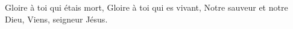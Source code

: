 Gloire à toi qui étais mort,
Gloire à toi qui es vivant,
Notre sauveur et notre Dieu,
Viens, seigneur Jésus.
